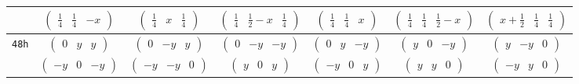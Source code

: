 \documentclass[fleqn,9pt,landscape]{jsarticle}
\begin{document}
\begin{center}
\begin{longtable}{ccccccc}
& $ \begin{pmatrix} \frac{1}{4} & \frac{1}{4} & - x \end{pmatrix} $ & $ \begin{pmatrix} \frac{1}{4} & x & \frac{1}{4} \end{pmatrix} $ & $ \begin{pmatrix} \frac{1}{4} & \frac{1}{2} - x & \frac{1}{4} \end{pmatrix} $ & $ \begin{pmatrix} \frac{1}{4} & \frac{1}{4} & x \end{pmatrix} $ & $ \begin{pmatrix} \frac{1}{4} & \frac{1}{4} & \frac{1}{2} - x \end{pmatrix} $ & $ \begin{pmatrix} x + \frac{1}{2} & \frac{1}{4} & \frac{1}{4} \end{pmatrix} $ \\ \hline
{\tt 48h} & $ \begin{pmatrix} 0 & y & y \end{pmatrix} $ & $ \begin{pmatrix} 0 & - y & y \end{pmatrix} $ & $ \begin{pmatrix} 0 & - y & - y \end{pmatrix} $ & $ \begin{pmatrix} 0 & y & - y \end{pmatrix} $ & $ \begin{pmatrix} y & 0 & - y \end{pmatrix} $ & $ \begin{pmatrix} y & - y & 0 \end{pmatrix} $ \\
& $ \begin{pmatrix} - y & 0 & - y \end{pmatrix} $ & $ \begin{pmatrix} - y & - y & 0 \end{pmatrix} $ & $ \begin{pmatrix} y & 0 & y \end{pmatrix} $ & $ \begin{pmatrix} - y & 0 & y \end{pmatrix} $ & $ \begin{pmatrix} y & y & 0 \end{pmatrix} $ & $ \begin{pmatrix} - y & y & 0 \end{pmatrix} $ \\ \hline

\end{longtable}
\end{center}
\end{document}
